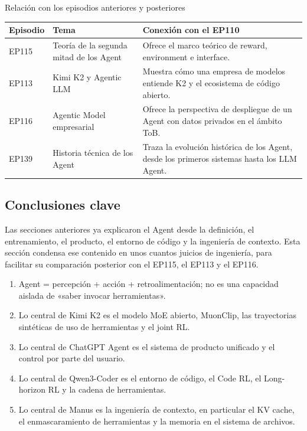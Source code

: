 \documentclass[a4paper]{article}
\begin{document}
\begin{knowledgebox}{Relación con los episodios anteriores y posteriores}
\begin{tabularx}{\textwidth}{p{}p{}X}
\toprule
Episodio & Tema & Conexión con el EP110 \\
\midrule
EP115 & Teoría de la segunda mitad de los Agent & Ofrece el marco teórico de reward, environment e interface. \\
EP113 & Kimi K2 y Agentic LLM & Muestra cómo una empresa de modelos entiende K2 y el ecosistema de código abierto. \\
EP116 & Agentic Model empresarial & Ofrece la perspectiva de despliegue de un Agent con datos privados en el ámbito ToB. \\
EP139 & Historia técnica de los Agent & Traza la evolución histórica de los Agent, desde los primeros sistemas hasta los LLM Agent. \\
\bottomrule
\end{tabularx}
\end{knowledgebox}

\subsection{Conclusiones clave}

Las secciones anteriores ya explicaron el Agent desde la definición, el entrenamiento, el producto, el entorno de código y la ingeniería de contexto. Esta sección condensa ese contenido en unos cuantos juicios de ingeniería, para facilitar su comparación posterior con el EP115, el EP113 y el EP116.

\begin{enumerate}
\item Agent = percepción + acción + retroalimentación; no es una capacidad aislada de «saber invocar herramientas».
\item Lo central de Kimi K2 es el modelo MoE abierto, MuonClip, las trayectorias sintéticas de uso de herramientas y el joint RL.
\item Lo central de ChatGPT Agent es el sistema de producto unificado y el control por parte del usuario.
\item Lo central de Qwen3-Coder es el entorno de código, el Code RL, el Long-horizon RL y la cadena de herramientas.
\item Lo central de Manus es la ingeniería de contexto, en particular el KV cache, el enmascaramiento de herramientas y la memoria en el sistema de archivos.
\end{enumerate}
\end{document}
